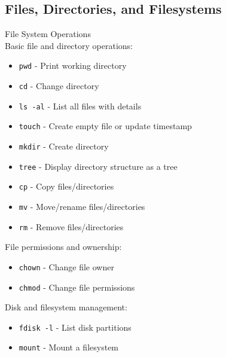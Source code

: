 \multend

\subsection{Files, Directories, and Filesystems}


\begin{definition}{File System Operations}\\
    Basic file and directory operations:
    \begin{itemize}
        \item \texttt{pwd} - Print working directory
        \item \texttt{cd} - Change directory
        \item \texttt{ls -al} - List all files with details
        \item \texttt{touch} - Create empty file or update timestamp
        \item \texttt{mkdir} - Create directory
        \item \texttt{tree} - Display directory structure as a tree
        \item \texttt{cp} - Copy files/directories
        \item \texttt{mv} - Move/rename files/directories
        \item \texttt{rm} - Remove files/directories
    \end{itemize}
    
    File permissions and ownership:
    \begin{itemize}
        \item \texttt{chown} - Change file owner
        \item \texttt{chmod} - Change file permissions
    \end{itemize}
    
    Disk and filesystem management:
    \begin{itemize}
        \item \texttt{fdisk -l} - List disk partitions
        \item \texttt{mount} - Mount a filesystem
    \end{itemize}
\end{definition}

